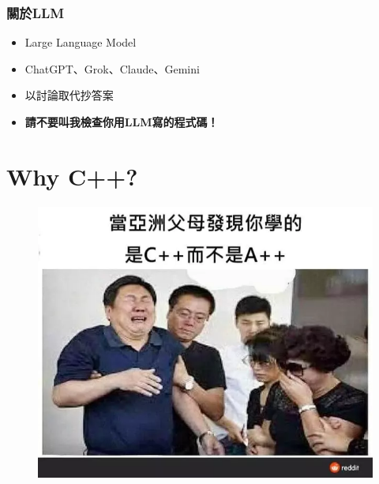 \documentclass[xcolor=dvipsnames]{beamer}
\begin{document}
    \begin{frame}
        \frametitle{關於LLM}
        \begin{itemize}
            \item Large Language Model
            \item ChatGPT、Grok、Claude、Gemini
            \item 以討論取代抄答案
            \item \textbf{請不要叫我檢查你用LLM寫的程式碼！}
        \end{itemize}
    \end{frame}

    \section{Why C++?}
    
    \begin{frame}
        \begin{figure}
            \centering
            \includegraphics[width=1\textwidth]{src/why_not_App.png}
        \end{figure}
    \end{frame}
\end{document}
